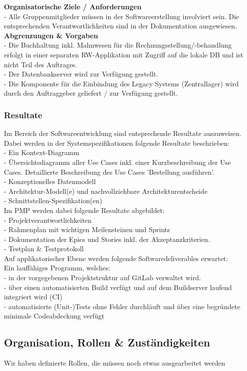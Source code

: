 \textbf{Organisatorische Ziele / Anforderungen}\\
- Alle Gruppenmitglieder müssen in der Softwareerstellung involviert sein. Die entsprechenden Verantwortlichkeiten sind in der Dokumentation ausgewiesen.\\

\textbf{Abgrenzungen \& Vorgaben}\\
- Die Buchhaltung inkl. Mahnwesen für die Rechnungsstellung/-behandlung erfolgt in einer separaten RW-Applikation mit Zugriff auf die lokale DB und ist nicht Teil des Auftrages.\\
- Der Datenbankserver wird zur Verfügung gestellt.\\
- Die Komponente für die Einbindung des Legacy Systems (Zentrallager) wird durch den Auftraggeber geliefert / zur Verfügung gestellt.\\

\subsubsection{Resultate}
Im Bereich der Softwareentwicklung sind entsprechende Resultate auszuweisen. Dabei werden in der Systemspezifikationen folgende Resultate beschrieben:\\
- Ein Kontext-Diagramm\\
- Übersichtsdiagramm aller Use Cases inkl. einer Kurzbeschreibung der Use Cases. Detaillierte Beschreibung des Use Cases 'Bestellung ausführen'.\\
- Konzeptionelles Datenmodell\\
- Architektur-Modell(e) und nachvollziehbare Architekturentscheide\\
- Schnittstellen-Spezifikation(en)\\

Im PMP werden dabei folgende Resultate abgebildet:\\
- Projektverantwortlichkeiten\\
- Rahmenplan mit wichtigen Meilensteinen und Sprints\\
- Dokumentation der Epics und Stories inkl. der Akzeptanzkriterien.\\
- Testplan \& Testprotokoll\\

Auf applikatorischer Ebene werden folgende Softwaredeliverables erwartet:\\
Ein lauffähiges Programm, welches:\\
- in der vorgegebenen Projektstruktur auf GitLab verwaltet wird.\\
- über einen automatisierten Build verfügt und auf dem Buildserver laufend integriert wird (CI)\\
- automatisierte (Unit-)Tests ohne Fehler durchläuft und über eine begründete minimale Codeabdeckung verfügt\\

\subsection{Organisation, Rollen \& Zuständigkeiten}
Wir haben definierte Rollen, die müssen noch etwas ausgearbeitet werden